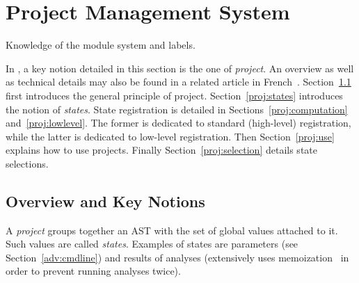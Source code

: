 
\section{Project Management System}\label{adv:project}

\begin{prereq}
  Knowledge of the \caml module system and labels.
\end{prereq}

In \framac, a key notion detailed in this section is the one of
\emph{project}. An overview as well as technical details may also be found in a
related article in French~\cite{project}. Section~\ref{proj:principle} first
introduces the general principle of project. Section~\ref{proj:states}
introduces the notion of \emph{states}. State registration is detailed in
Sections~\ref{proj:computation} and~\ref{proj:lowlevel}. The former is dedicated
to standard (high-level) registration, while the latter is dedicated to
low-level registration. Then Section~\ref{proj:use} explains how to use
projects. Finally Section~\ref{proj:selection} details state selections.

\subsection{Overview and Key Notions}\label{proj:principle}

A \emph{project} groups together an AST with the set of
global values attached to it. Such values are called
\emph{states}. Examples of states are
parameters (see Section~\ref{adv:cmdline}) and
results of analyses (\framac extensively uses
memoization~\cite{michie67,michie68} in order to prevent
running analyses twice).


